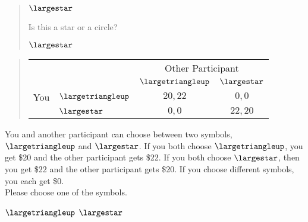 \documentclass[11pt]{article}
\begin{document}
\begin{tcolorbox}
\begin{quote}
\begin{center}
{\Huge $\largestar$}
\end{center}
 \centering Is this a star or a circle?

 \begin{center}
$\largestar$ \qquad \textbigcircle
\end{center}
\end{quote}

\begin{quote}
\begin{center}
\begin{tabular}{llcc}
    & & \multicolumn{2}{c}{Other Participant}  \\
& & $\largetriangleup$ & $\largestar$  \\ \cline{3-4}
You & $\largetriangleup$ & \multicolumn{1}{|c|}{$20,22$} & \multicolumn{1}{c|}{$0,0$}  \\ \cline{3-4}
& $\largestar$ & \multicolumn{1}{|c|}{$0,0$} & \multicolumn{1}{c|}{$22,20$}  \\ \cline{3-4}
\end{tabular}
\end{center}
\end{quote}


You and another participant can choose between two symbols, $\largetriangleup$ and $\largestar$. If you both choose $\largetriangleup$, you get \$20 and the other participant gets \$22. If you both choose $\largestar$, then you get \$22 and the other participant gets \$20. If you choose different symbols, you each get \$0.\\

Please choose one of the symbols.\\

\begin{center}
$\largetriangleup$ \qquad $\largestar$
\end{center}
\end{tcolorbox}
\end{document}

